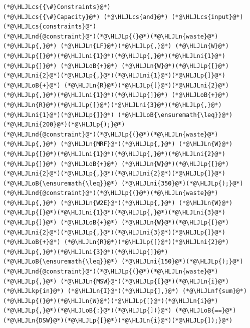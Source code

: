 \documentclass[12pt,a4paper]{article}
\newcommand{\HLJLkp}[1]{\textcolor[RGB]{148,91,176}{\textbf{#1}}}
\newcommand{\HLJLn}[1]{#1}
\newcommand{\HLJLnd}[1]{\textcolor[RGB]{214,102,97}{#1}}
\newcommand{\HLJLnf}[1]{\textcolor[RGB]{66,102,213}{#1}}
\newcommand{\HLJLni}[1]{\textcolor[RGB]{59,151,46}{#1}}
\newcommand{\HLJLoB}[1]{\textcolor[RGB]{102,102,102}{\textbf{#1}}}
\newcommand{\HLJLp}[1]{#1}
\newcommand{\HLJLcs}[1]{\textcolor[RGB]{153,153,119}{\textit{#1}}}
\begin{document}
\begin{lstlisting}
(*@\HLJLcs{{\#}Constraints}@*)
(*@\HLJLcs{{\#}Capacity}@*) (*@\HLJLcs{and}@*) (*@\HLJLcs{input}@*) (*@\HLJLcs{constraints}@*)
(*@\HLJLnd{@constraint}@*)(*@\HLJLp{(}@*)(*@\HLJLn{waste}@*)(*@\HLJLp{,}@*) (*@\HLJLn{LF}@*)(*@\HLJLp{,}@*) (*@\HLJLn{W}@*)(*@\HLJLp{[}@*)(*@\HLJLni{1}@*)(*@\HLJLp{,}@*)(*@\HLJLni{1}@*)(*@\HLJLp{]}@*) (*@\HLJLoB{+}@*) (*@\HLJLn{W}@*)(*@\HLJLp{[}@*)(*@\HLJLni{2}@*)(*@\HLJLp{,}@*)(*@\HLJLni{1}@*)(*@\HLJLp{]}@*) (*@\HLJLoB{+}@*) (*@\HLJLn{R}@*)(*@\HLJLp{[}@*)(*@\HLJLni{2}@*)(*@\HLJLp{,}@*)(*@\HLJLni{1}@*)(*@\HLJLp{]}@*) (*@\HLJLoB{+}@*) (*@\HLJLn{R}@*)(*@\HLJLp{[}@*)(*@\HLJLni{3}@*)(*@\HLJLp{,}@*)(*@\HLJLni{1}@*)(*@\HLJLp{]}@*) (*@\HLJLoB{\ensuremath{\leq}}@*) (*@\HLJLni{200}@*)(*@\HLJLp{);}@*)
(*@\HLJLnd{@constraint}@*)(*@\HLJLp{(}@*)(*@\HLJLn{waste}@*)(*@\HLJLp{,}@*) (*@\HLJLn{MRF}@*)(*@\HLJLp{,}@*) (*@\HLJLn{W}@*)(*@\HLJLp{[}@*)(*@\HLJLni{1}@*)(*@\HLJLp{,}@*)(*@\HLJLni{2}@*)(*@\HLJLp{]}@*) (*@\HLJLoB{+}@*) (*@\HLJLn{W}@*)(*@\HLJLp{[}@*)(*@\HLJLni{2}@*)(*@\HLJLp{,}@*)(*@\HLJLni{2}@*)(*@\HLJLp{]}@*) (*@\HLJLoB{\ensuremath{\leq}}@*) (*@\HLJLni{350}@*)(*@\HLJLp{);}@*)
(*@\HLJLnd{@constraint}@*)(*@\HLJLp{(}@*)(*@\HLJLn{waste}@*)(*@\HLJLp{,}@*) (*@\HLJLn{W2E}@*)(*@\HLJLp{,}@*) (*@\HLJLn{W}@*)(*@\HLJLp{[}@*)(*@\HLJLni{1}@*)(*@\HLJLp{,}@*)(*@\HLJLni{3}@*)(*@\HLJLp{]}@*) (*@\HLJLoB{+}@*) (*@\HLJLn{W}@*)(*@\HLJLp{[}@*)(*@\HLJLni{2}@*)(*@\HLJLp{,}@*)(*@\HLJLni{3}@*)(*@\HLJLp{]}@*) (*@\HLJLoB{+}@*) (*@\HLJLn{R}@*)(*@\HLJLp{[}@*)(*@\HLJLni{2}@*)(*@\HLJLp{,}@*)(*@\HLJLni{3}@*)(*@\HLJLp{]}@*) (*@\HLJLoB{\ensuremath{\leq}}@*) (*@\HLJLni{150}@*)(*@\HLJLp{);}@*)
(*@\HLJLnd{@constraint}@*)(*@\HLJLp{(}@*)(*@\HLJLn{waste}@*)(*@\HLJLp{,}@*) (*@\HLJLn{MSW}@*)(*@\HLJLp{[}@*)(*@\HLJLn{i}@*) (*@\HLJLkp{in}@*) (*@\HLJLn{I}@*)(*@\HLJLp{],}@*) (*@\HLJLnf{sum}@*)(*@\HLJLp{(}@*)(*@\HLJLn{W}@*)(*@\HLJLp{[}@*)(*@\HLJLn{i}@*)(*@\HLJLp{,}@*)(*@\HLJLoB{:}@*)(*@\HLJLp{])}@*) (*@\HLJLoB{==}@*) (*@\HLJLn{DSW}@*)(*@\HLJLp{[}@*)(*@\HLJLn{i}@*)(*@\HLJLp{]);}@*)


\end{lstlisting}
\end{document}
